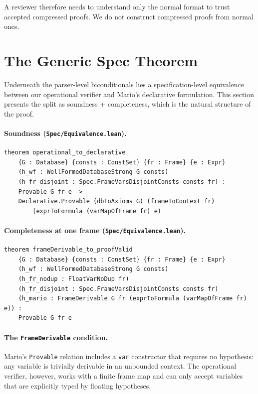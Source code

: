 \documentclass[11pt]{article}
\newcommand{\lean}[1]{\lstinline[language=Lean4]{#1}}
\newcommand{\file}[1]{\texttt{#1}}
\begin{document}
A reviewer therefore needs to understand only the normal format to trust
accepted compressed proofs.  We do not construct compressed proofs from normal ones.

\section{The Generic Spec Theorem}
\label{sec:generic}

Underneath the parser-level biconditionals lies a specification-level
equivalence between our operational verifier and Mario's declarative
formulation. This section presents the split as soundness + completeness,
which is the natural structure of the proof.

\paragraph{Soundness (\file{Spec/Equivalence.lean}).}

\begin{lstlisting}[caption={Soundness: operational acceptance implies semantic validity.},label=lst:sound]
theorem operational_to_declarative
    {G : Database} {consts : ConstSet} {fr : Frame} {e : Expr}
    (h_wf : WellFormedDatabaseStrong G consts)
    (h_fr_disjoint : Spec.FrameVarsDisjointConsts consts fr) :
    Provable G fr e ->
    Declarative.Provable (dbToAxioms G) (frameToContext fr)
        (exprToFormula (varMapOfFrame fr) e)
\end{lstlisting}

\paragraph{Completeness at one frame (\file{Spec/Equivalence.lean}).}

\begin{lstlisting}[caption={Completeness: frame derivability implies operational acceptance.},label=lst:complete]
theorem frameDerivable_to_proofValid
    {G : Database} {consts : ConstSet} {fr : Frame} {e : Expr}
    (h_wf : WellFormedDatabaseStrong G consts)
    (h_fr_nodup : FloatVarNoDup fr)
    (h_fr_disjoint : Spec.FrameVarsDisjointConsts consts fr)
    (h_mario : FrameDerivable G fr (exprToFormula (varMapOfFrame fr) e)) :
    Provable G fr e
\end{lstlisting}

\paragraph{The \lean{FrameDerivable} condition.}
Mario's \lean{Provable} relation includes a \lean{var} constructor that
requires no hypothesis: any variable is trivially derivable in an
unbounded context.  The operational verifier, however, works with a
finite frame map and can only accept variables that are explicitly
typed by floating hypotheses.
\end{document}
